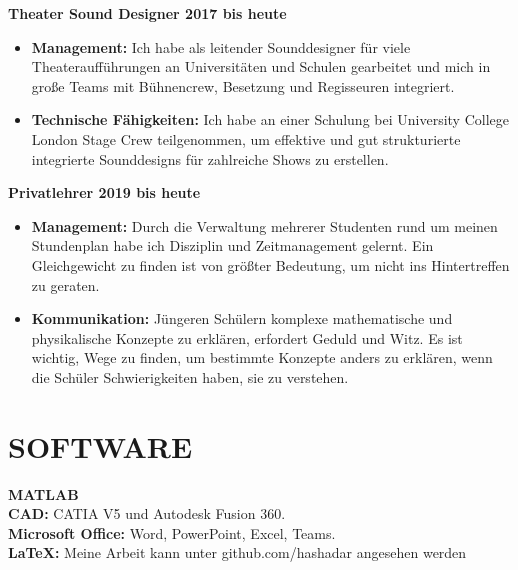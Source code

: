 \documentclass[margin, 10pt]{res} %
\begin{document}
\begin{resume}
\textbf{Theater Sound Designer \hfill 2017 bis heute}
\\
\begin{itemize}
  \item \textbf{Management:} Ich habe als leitender Sounddesigner für viele Theateraufführungen an Universitäten und Schulen gearbeitet und mich in große Teams mit Bühnencrew, Besetzung und Regisseuren integriert.
  \item \textbf{Technische Fähigkeiten:} Ich habe an einer Schulung bei University College London Stage Crew teilgenommen, um effektive und gut strukturierte integrierte Sounddesigns für zahlreiche Shows zu erstellen.
\end{itemize}

\textbf{Privatlehrer \hfill 2019 bis heute}
\\
\begin{itemize}
  \item \textbf{Management:} Durch die Verwaltung mehrerer Studenten rund um meinen Stundenplan habe ich Disziplin und Zeitmanagement gelernt. Ein Gleichgewicht zu finden ist von größter Bedeutung, um nicht ins Hintertreffen zu geraten.
  \item \textbf{Kommunikation:} Jüngeren Schülern komplexe mathematische und physikalische Konzepte zu erklären, erfordert Geduld und Witz. Es ist wichtig, Wege zu finden, um bestimmte Konzepte anders zu erklären, wenn die Schüler Schwierigkeiten haben, sie zu verstehen.
\end{itemize}


\section{SOFTWARE}
\textbf{MATLAB}\\
\textbf{CAD:} CATIA V5 und Autodesk Fusion 360.\\
\textbf{Microsoft Office:} Word, PowerPoint, Excel, Teams.\\
\textbf{LaTeX:} Meine Arbeit kann unter github.com/hashadar angesehen werden



\end{resume}
\end{document}
